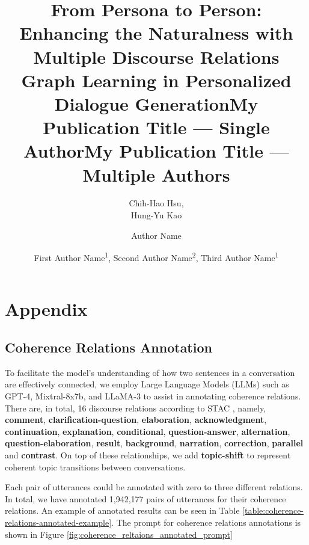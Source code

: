 \documentclass[letterpaper]{article} %
\title{From Persona to Person: Enhancing the Naturalness with Multiple Discourse Relations Graph Learning in Personalized Dialogue Generation}
\author{
    Chih-Hao Hsu, \\
    Hung-Yu Kao
}
\title{My Publication Title --- Single Author}
\author {
    Author Name
}
\title{My Publication Title --- Multiple Authors}
\author {
    First Author Name\textsuperscript{\rm 1},
    Second Author Name\textsuperscript{\rm 2},
    Third Author Name\textsuperscript{\rm 1}
}
\begin{document}
\maketitle

\appendix
\section{Appendix}

\subsection{Coherence Relations Annotation} \label{sec:coherence_reltaions_annotation}
To facilitate the model's understanding of how two sentences in a conversation are effectively connected, we employ Large Language Models (LLMs) such as GPT-4, Mixtral-8x7b, and LLaMA-3 to assist in annotating coherence relations. There are, in total, 16 discourse relations according to STAC \cite{asher-etal-2016-discourse}, namely, \textbf{comment}, \textbf{clarification-question}, \textbf{elaboration}, \textbf{acknowledgment}, \textbf{continuation}, \textbf{explanation}, \textbf{conditional}, \textbf{question-answer}, \textbf{alternation}, \textbf{question-elaboration}, \textbf{result}, \textbf{background}, \textbf{narration}, \textbf{correction}, \textbf{parallel} and \textbf{contrast}. On top of these relationships, we add \textbf{topic-shift} to represent coherent topic transitions between conversations. 

Each pair of utterances could be annotated with zero to three different relations. In total, we have annotated 1,942,177 pairs of utterances for their coherence relations. An example of annotated results can be seen in Table \ref{table:coherence-relations-annotated-example}. The prompt for coherence relations annotations is shown in Figure \ref{fig:coherence_reltaions_annotated_prompt}
\end{document}
